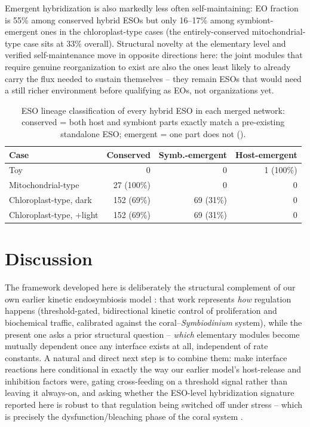 \documentclass[9pt,twocolumn,twoside]{pnas-new}
\begin{document}
Emergent hybridization is also markedly less often self-maintaining: EO fraction is 55\% among conserved hybrid ESOs but only 16--17\% among symbiont-emergent ones in the chloroplast-type cases (the entirely-conserved mitochondrial-type case sits at 33\% overall). Structural novelty at the elementary level and verified self-maintenance move in opposite directions here: the joint modules that require genuine reorganization to exist are also the ones least likely to already carry the flux needed to sustain themselves -- they remain ESOs that would need a still richer environment before qualifying as EOs, not organizations yet.

\begin{table}[t]
\centering
\caption{ESO lineage classification of every hybrid ESO in each merged network: conserved = both host and symbiont parts exactly match a pre-existing standalone ESO; emergent = one part does not (\matmethods{}).}
\label{tab:lineage}
\small
\begin{tabular}{lrrr}
\toprule
Case & Conserved & Symb.-emergent & Host-emergent \\
\midrule
Toy & 0 & 0 & 1 (100\%) \\
Mitochondrial-type & 27 (100\%) & 0 & 0 \\
Chloroplast-type, dark & 152 (69\%) & 69 (31\%) & 0 \\
Chloroplast-type, +light & 152 (69\%) & 69 (31\%) & 0 \\
\bottomrule
\end{tabular}
\end{table}

\section*{Discussion}
The framework developed here is deliberately the structural complement of our own earlier kinetic endosymbiosis model \cite{velozflores2020soft,velozflores2021}: that work represents \emph{how} regulation happens (threshold-gated, bidirectional kinetic control of proliferation and biochemical traffic, calibrated against the coral--\textit{Symbiodinium} system), while the present one asks a prior structural question -- \emph{which} elementary modules become mutually dependent once any interface exists at all, independent of rate constants. A natural and direct next step is to combine them: make interface reactions here conditional in exactly the way our earlier model's host-release and inhibition factors were, gating cross-feeding on a threshold signal rather than leaving it always-on, and asking whether the ESO-level hybridization signature reported here is robust to that regulation being switched off under stress -- which is precisely the dysfunction/bleaching phase of the coral system \cite{velozflores2021}.
\end{document}
